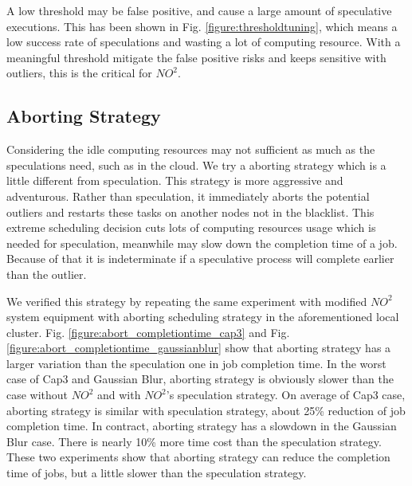 A low threshold may be false positive, and cause a large amount of speculative executions. This has been shown in Fig.  \ref{figure:thresholdtuning}, which means a low success rate of speculations and wasting a lot of computing resource. With a meaningful threshold mitigate the false positive risks and keeps sensitive with outliers, this is the critical for $NO^2$.

\subsection{Aborting Strategy}

Considering the idle computing resources may not sufficient as much as the speculations need, such as in the cloud. We try a aborting strategy which is a little different from speculation. This strategy is more aggressive and adventurous. Rather than speculation, it immediately aborts the potential outliers and restarts these tasks on another nodes not in the blacklist. This extreme scheduling decision cuts lots of computing resources usage which is needed for speculation, meanwhile may slow down the completion time of a job. Because of that it is indeterminate if a speculative process will complete earlier than the outlier.

We verified this strategy by repeating the same experiment with modified $NO^2$ system equipment with aborting scheduling strategy in the aforementioned local cluster. Fig. \ref{figure:abort_completiontime_cap3} and Fig. \ref{figure:abort_completiontime_gaussianblur} show that aborting strategy has a larger variation than the speculation one in job completion time. In the worst case of Cap3 and Gaussian Blur, aborting strategy is obviously slower than the case without $NO^2$ and with $NO^2$'s speculation strategy. On average of Cap3 case, aborting strategy is similar with speculation strategy, about 25\% reduction of job completion time. In contract, aborting strategy has a slowdown in the Gaussian Blur case. There is nearly 10\% more time cost than the speculation strategy. These two experiments show that aborting strategy can reduce the completion time of jobs, but a little slower than the speculation strategy.

